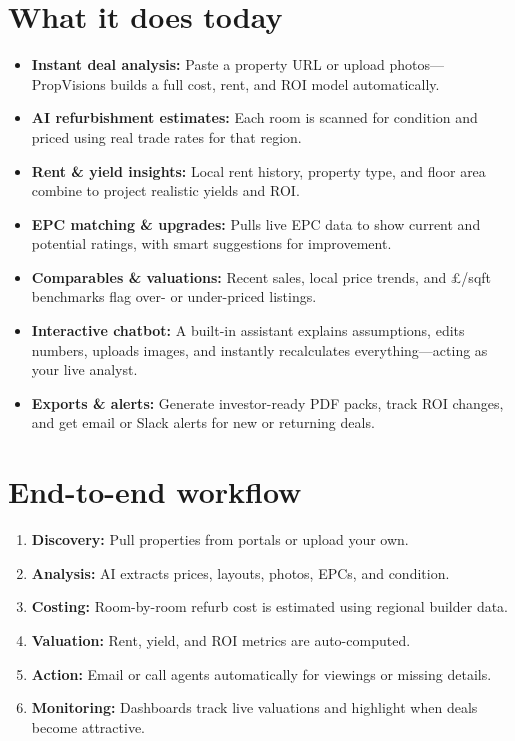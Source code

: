 \documentclass[11pt,a4paper]{article}
\begin{document}
\section*{What it does today}
\begin{itemize}
  \item \textbf{Instant deal analysis:} Paste a property URL or upload photos—PropVisions builds a full cost, rent, and ROI model automatically.
  \item \textbf{AI refurbishment estimates:} Each room is scanned for condition and priced using real trade rates for that region.
  \item \textbf{Rent \& yield insights:} Local rent history, property type, and floor area combine to project realistic yields and ROI.
  \item \textbf{EPC matching \& upgrades:} Pulls live EPC data to show current and potential ratings, with smart suggestions for improvement.
  \item \textbf{Comparables \& valuations:} Recent sales, local price trends, and £/sqft benchmarks flag over- or under-priced listings.
  \item \textbf{Interactive chatbot:} A built-in assistant explains assumptions, edits numbers, uploads images, and instantly recalculates everything—acting as your live analyst.
  \item \textbf{Exports \& alerts:} Generate investor-ready PDF packs, track ROI changes, and get email or Slack alerts for new or returning deals.
\end{itemize}

\section*{End-to-end workflow}
\begin{enumerate}
  \item \textbf{Discovery:} Pull properties from portals or upload your own.
  \item \textbf{Analysis:} AI extracts prices, layouts, photos, EPCs, and condition.
  \item \textbf{Costing:} Room-by-room refurb cost is estimated using regional builder data.
  \item \textbf{Valuation:} Rent, yield, and ROI metrics are auto-computed.
  \item \textbf{Action:} Email or call agents automatically for viewings or missing details.
  \item \textbf{Monitoring:} Dashboards track live valuations and highlight when deals become attractive.
\end{enumerate}
\end{document}

